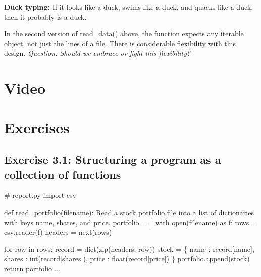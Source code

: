 \documentclass[
  letterpaper,
  DIV=11,
  numbers=noendperiod]{scrreprt}
\newenvironment{Shaded}{\begin{snugshade}}{\end{snugshade}}
\newcommand{\BuiltInTok}[1]{\textcolor[rgb]{0.00,0.46,0.62}{#1}}
\newcommand{\CommentTok}[1]{\textcolor[rgb]{0.37,0.37,0.37}{#1}}
\newcommand{\ControlFlowTok}[1]{\textcolor[rgb]{0.00,0.46,0.62}{#1}}
\newcommand{\ImportTok}[1]{\textcolor[rgb]{0.00,0.46,0.62}{#1}}
\newcommand{\KeywordTok}[1]{\textcolor[rgb]{0.00,0.46,0.62}{#1}}
\newcommand{\NormalTok}[1]{\textcolor[rgb]{0.00,0.46,0.62}{#1}}
\newcommand{\OperatorTok}[1]{\textcolor[rgb]{0.37,0.37,0.37}{#1}}
\newcommand{\StringTok}[1]{\textcolor[rgb]{0.13,0.47,0.30}{#1}}
\begin{document}
\textbf{Duck typing:} If it looks like a duck, swims like a duck, and
quacks like a duck, then it probably is a duck.

In the second version of read\_data() above, the function expects any
iterable object, not just the lines of a file. There is considerable
flexibility with this design. \emph{Question: Should we embrace or fight
this flexibility?}

\hypertarget{video-2}{%
\chapter{Video}\label{video-2}}

\hypertarget{exercises}{%
\chapter{Exercises}\label{exercises}}

\hypertarget{exercise-3.1-structuring-a-program-as-a-collection-of-functions}{%
\section{Exercise 3.1: Structuring a program as a collection of
functions}\label{exercise-3.1-structuring-a-program-as-a-collection-of-functions}}

\begin{Shaded}
\begin{Highlighting}[]
\CommentTok{\# report.py}
\ImportTok{import}\NormalTok{ csv}

\KeywordTok{def}\NormalTok{ read\_portfolio(filename):}
    \CommentTok{\textquotesingle{}\textquotesingle{}\textquotesingle{}}
\CommentTok{    Read a stock portfolio file into a list of dictionaries with keys}
\CommentTok{    name, shares, and price.}
\CommentTok{    \textquotesingle{}\textquotesingle{}\textquotesingle{}}
\NormalTok{    portfolio }\OperatorTok{=}\NormalTok{ []}
    \ControlFlowTok{with} \BuiltInTok{open}\NormalTok{(filename) }\ImportTok{as}\NormalTok{ f:}
\NormalTok{        rows }\OperatorTok{=}\NormalTok{ csv.reader(f)}
\NormalTok{        headers }\OperatorTok{=} \BuiltInTok{next}\NormalTok{(rows)}

        \ControlFlowTok{for}\NormalTok{ row }\KeywordTok{in}\NormalTok{ rows:}
\NormalTok{            record }\OperatorTok{=} \BuiltInTok{dict}\NormalTok{(}\BuiltInTok{zip}\NormalTok{(headers, row))}
\NormalTok{            stock }\OperatorTok{=}\NormalTok{ \{}
                \StringTok{\textquotesingle{}name\textquotesingle{}}\NormalTok{ : record[}\StringTok{\textquotesingle{}name\textquotesingle{}}\NormalTok{],}
                \StringTok{\textquotesingle{}shares\textquotesingle{}}\NormalTok{ : }\BuiltInTok{int}\NormalTok{(record[}\StringTok{\textquotesingle{}shares\textquotesingle{}}\NormalTok{]),}
                \StringTok{\textquotesingle{}price\textquotesingle{}}\NormalTok{ : }\BuiltInTok{float}\NormalTok{(record[}\StringTok{\textquotesingle{}price\textquotesingle{}}\NormalTok{])}
\NormalTok{            \}}
\NormalTok{            portfolio.append(stock)}
    \ControlFlowTok{return}\NormalTok{ portfolio}
\NormalTok{...}
\end{Highlighting}
\end{Shaded}
\end{document}
